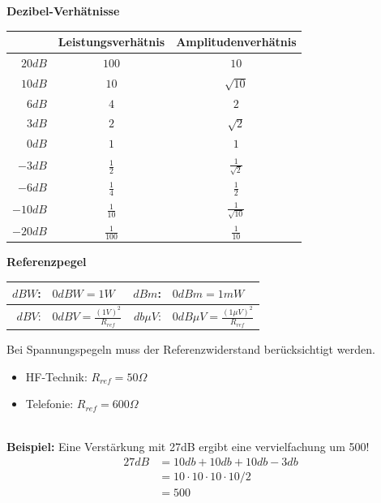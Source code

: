 \noindent\textbf{Dezibel-Verhätnisse}\\
\begin{table}[H]
	\begin{tabular}{r|c|c}
		& Leistungsverhätnis & Amplitudenverhätnis \\		\toprule
		$20dB$ & $100$ & $10$ \\ \midrule
		$10dB$ & $10$ & $\sqrt{10}$ \\\midrule
		$6dB$ & $4$ & $2$ \\\midrule
		$3dB$ & $2$ & $\sqrt{2}$ \\\midrule
		$0dB$ & $1$ & $1$ \\\midrule
		$-3dB$ & $\frac{1}{2}$ & $\frac{1}{\sqrt{2}}$ \\\midrule
		$-6dB$ & $\frac{1}{4}$ & $\frac{1}{2}$ \\\midrule
		$-10dB$ & $\frac{1}{10}$ & $\frac{1}{\sqrt{10}}$ \\\midrule
		$-20dB$ & $\frac{1}{100}$ & $\frac{1}{10}$ \\\midrule
	\end{tabular}
\end{table}
\noindent\textbf{Referenzpegel} 
\begin{table}[H]
	\begin{tabular}{rl || rl}
		$dBW$: & $0dBW = 1W$ & $dBm$: & $0dBm = 1mW$ \\ \midrule
		$dBV$: & $0dBV = \frac{(1V)^2}{R_{ref}}$& $db\mu V$: & $0dB\mu V = \frac{(1\mu V)^2}{R_{ref}}$ 
	\end{tabular}
\end{table}

\noindent Bei Spannungspegeln muss der Referenzwiderstand berücksichtigt werden.\\
\begin{itemize}[nosep]
	\item HF-Technik: $R_{ref} = 50 \Omega$
	\item Telefonie:  $R_{ref} = 600 \Omega$
\end{itemize}

~\\
\noindent\textbf{Beispiel:} Eine Verstärkung mit 27dB ergibt eine vervielfachung um 500!
\begin{align*}
	27dB &= 10db + 10db +10db - 3db \\
	&= 10 \cdot 10 \cdot 10 \cdot 10 / 2 \\
	&= 500
\end{align*}